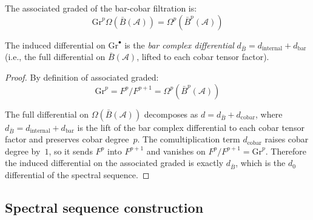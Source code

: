 \begin{lemma}\label{lem:bar-cobar-associated-graded}
The associated graded of the bar-cobar filtration is:
\[\text{Gr}^p\Omega(\bar{B}(\mathcal{A})) = \Omega^p(\bar{B}^p(\mathcal{A}))\]

The induced differential on $\text{Gr}^\bullet$ is the \emph{bar complex differential} $d_{\bar{B}} = d_{\text{internal}} + d_{\text{bar}}$ (i.e., the full differential on $\bar{B}(\mathcal{A})$, lifted to each cobar tensor factor).
\end{lemma}

\begin{proof}
By definition of associated graded:
\[\text{Gr}^p = F^p / F^{p+1} = \Omega^p(\bar{B}^p(\mathcal{A}))\]

The full differential on $\Omega(\bar{B}(\mathcal{A}))$ decomposes as
$d = d_{\bar{B}} + d_{\text{cobar}}$, where
$d_{\bar{B}} = d_{\text{internal}} + d_{\text{bar}}$ is the lift of
the bar complex differential to each cobar tensor factor and preserves
cobar degree~$p$.
The comultiplication term $d_{\text{cobar}}$ raises cobar degree by~$1$,
so it sends $F^p$ into $F^{p+1}$ and vanishes on
$F^p/F^{p+1}=\text{Gr}^p$.
Therefore the induced differential on the associated graded is exactly
$d_{\bar{B}}$, which is the $d_0$ differential of the spectral
sequence.
\end{proof}

\subsection{Spectral sequence construction}

